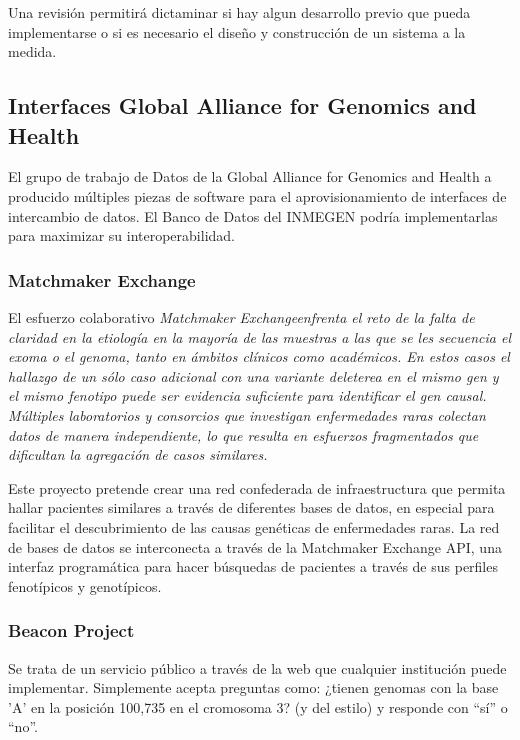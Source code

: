 \documentclass[
10pt, %
letterpaper, %
oneside, %
headinclude,footinclude, %
BCOR5mm, %
]{scrartcl}
\begin{document}
Una revisión permitirá dictaminar si hay algun desarrollo previo que
pueda implementarse o si es necesario el diseño y construcción de un
sistema a la medida.

\cite{_data_????} \cite{altman_proposed_2007}

\subsection{Interfaces Global Alliance for Genomics and Health}

El grupo de trabajo de Datos de la Global Alliance for Genomics and
Health a producido múltiples piezas de software para el
aprovisionamiento de interfaces de intercambio de datos. El Banco de
Datos del INMEGEN podría implementarlas para maximizar su
interoperabilidad.

\subsubsection{Matchmaker Exchange}

El esfuerzo colaborativo \em{Matchmaker Exchange}\em  enfrenta el reto de la
falta de claridad en la etiología en la mayoría de las muestras a las
que se les secuencia el exoma o el genoma, tanto en ámbitos clínicos
como académicos. En estos casos el hallazgo de un sólo caso adicional
con una variante deleterea en el mismo gen y el mismo fenotipo puede
ser evidencia suficiente para identificar el gen causal. Múltiples
laboratorios y consorcios que investigan enfermedades raras colectan
datos de manera independiente, lo que resulta en esfuerzos
fragmentados que dificultan la agregación de casos similares.

Este proyecto pretende crear una red confederada de infraestructura
que permita hallar pacientes similares a través de diferentes bases de
datos, en especial para facilitar el descubrimiento de las causas
genéticas de enfermedades raras. La red de bases de datos se
interconecta a través de la Matchmaker Exchange API, una interfaz
programática para hacer búsquedas de pacientes a través de sus
perfiles fenotípicos y genotípicos.\cite{_matchmaker_????}


\subsubsection{Beacon Project}
Se trata de un servicio público a través de la web que cualquier
institución puede implementar. Simplemente acepta preguntas como:
¿tienen genomas con la base 'A' en la posición 100,735 en el cromosoma
3? (y del estilo) y responde con ``sí'' o ``no''.
\end{document}
